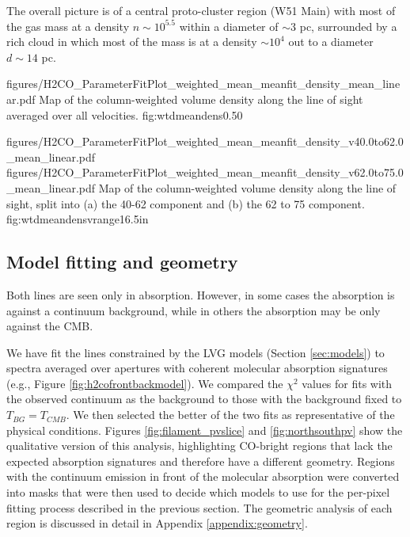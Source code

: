 The overall picture is of a central proto-cluster region (W51 Main) with most
of the gas mass at a density $n\sim10^{5.5}$ \percc within a diameter of
$\sim3$ pc, surrounded by a rich cloud in which most of the mass is at a
density $\sim10^4$ \percc out to a diameter $d\sim14$ pc.


\Figure
{figures/H2CO_ParameterFitPlot_weighted_mean_meanfit_density_mean_linear.pdf}
{Map of the column-weighted volume density along the line of sight averaged
over all velocities.  }
{fig:wtdmeandens}{0.5}{0}

\FigureTwoAA
{figures/H2CO_ParameterFitPlot_weighted_mean_meanfit_density_v40.0to62.0_mean_linear.pdf}
{figures/H2CO_ParameterFitPlot_weighted_mean_meanfit_density_v62.0to75.0_mean_linear.pdf}
{Map of the column-weighted volume density along the line of sight, split into 
(a) the 40-62 \kms component and (b) the 62 to 75 \kms component.}
{fig:wtdmeandensvrange}{1}{6.5in}

\subsection{Model fitting and geometry}
\label{sec:geometry}
Both \formaldehyde lines are seen only in absorption.  However, in some cases
the absorption is against a continuum background, while in others the
absorption may be only against the CMB.

We have fit the \formaldehyde lines constrained by the LVG models (Section
\ref{sec:models}) to spectra averaged over apertures with coherent molecular
absorption signatures (e.g., Figure \ref{fig:h2cofrontbackmodel}).  We compared
the $\chi^2$ values for fits with the observed continuum as the background to
those with the background fixed to $T_{BG} = T_{CMB}$.  We then selected the
better of the two fits as representative of the physical conditions.  Figures
\ref{fig:filament_pvslice} and \ref{fig:northsouthpv} show the qualitative
version of this analysis, highlighting CO-bright regions that lack the expected
\formaldehyde absorption signatures and therefore have a different geometry.
Regions with the continuum emission in front of the molecular absorption were
converted into masks that were then used to decide which models to use for the
per-pixel fitting process described in the previous section.  The geometric
analysis of each region is discussed in detail in Appendix
\ref{appendix:geometry}.

